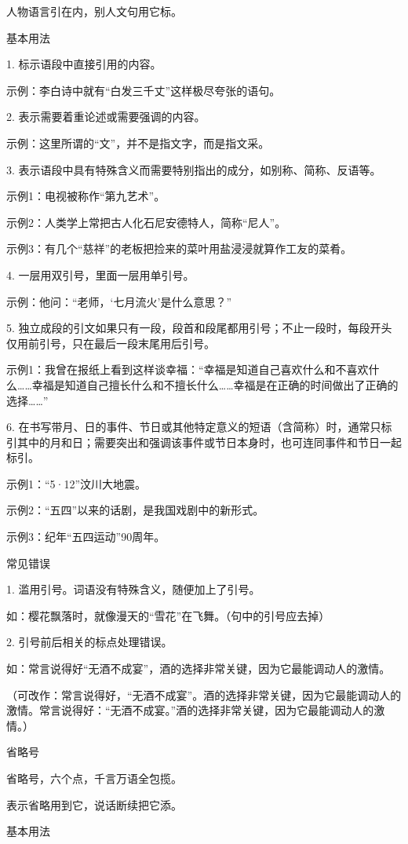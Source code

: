 人物语言引在内，别人文句用它标。

基本用法

1. 标示语段中直接引用的内容。

示例：李白诗中就有“白发三千丈”这样极尽夸张的语句。

2. 表示需要着重论述或需要强调的内容。

示例：这里所谓的“文”，并不是指文字，而是指文采。

3. 表示语段中具有特殊含义而需要特别指出的成分，如别称、简称、反语等。

示例1：电视被称作“第九艺术”。

示例2：人类学上常把古人化石尼安德特人，简称“尼人”。

示例3：有几个“慈祥”的老板把捡来的菜叶用盐浸浸就算作工友的菜肴。

4. 一层用双引号，里面一层用单引号。

示例：他问：“老师，‘七月流火’是什么意思？”

5. 独立成段的引文如果只有一段，段首和段尾都用引号；不止一段时，每段开头仅用前引号，只在最后一段末尾用后引号。

示例1：我曾在报纸上看到这样谈幸福：“幸福是知道自己喜欢什么和不喜欢什么……幸福是知道自己擅长什么和不擅长什么……幸福是在正确的时间做出了正确的选择……”

6. 在书写带月、日的事件、节日或其他特定意义的短语（含简称）时，通常只标引其中的月和日；需要突出和强调该事件或节日本身时，也可连同事件和节日一起标引。

示例1：“5·12”汶川大地震。

示例2：“五四”以来的话剧，是我国戏剧中的新形式。

示例3：纪年“五四运动”90周年。

常见错误

1. 滥用引号。词语没有特殊含义，随便加上了引号。

如：樱花飘落时，就像漫天的“雪花”在飞舞。（句中的引号应去掉）

2. 引号前后相关的标点处理错误。

如：常言说得好“无酒不成宴”，酒的选择非常关键，因为它最能调动人的激情。

（可改作：常言说得好，“无酒不成宴”。酒的选择非常关键，因为它最能调动人的激情。常言说得好：“无酒不成宴。”酒的选择非常关键，因为它最能调动人的激情。）

省略号

省略号，六个点，千言万语全包揽。

表示省略用到它，说话断续把它添。

基本用法

